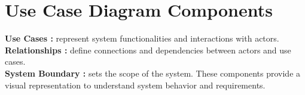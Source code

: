 \section{Use Case Diagram Components}
\vspace{0.2cm}
\textbf{Use Cases :} represent system functionalities and interactions with actors.\\
\textbf{Relationships :} define connections and dependencies between actors and use cases.\\
\textbf{System Boundary :} sets the scope of the system. These components provide a visual representation to understand system behavior and requirements.\\
